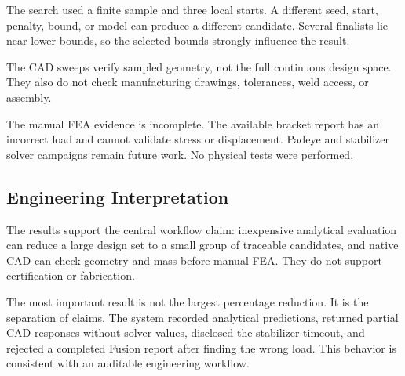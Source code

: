 The search used a finite sample and three local starts. A different seed,
start, penalty, bound, or model can produce a different candidate. Several
finalists lie near lower bounds, so the selected bounds strongly influence the
result.

The CAD sweeps verify sampled geometry, not the full continuous design space.
They also do not check manufacturing drawings, tolerances, weld access, or
assembly.

The manual FEA evidence is incomplete. The available bracket report has an
incorrect load and cannot validate stress or displacement. Padeye and
stabilizer solver campaigns remain future work. No physical tests were
performed.

\subsection{Engineering Interpretation}

The results support the central workflow claim: inexpensive analytical
evaluation can reduce a large design set to a small group of traceable
candidates, and native CAD can check geometry and mass before manual FEA.
They do not support certification or fabrication.

The most important result is not the largest percentage reduction. It is the
separation of claims. The system recorded analytical predictions, returned
partial CAD responses without solver values, disclosed the stabilizer timeout,
and rejected a completed Fusion report after finding the wrong load. This
behavior is consistent with an auditable engineering workflow.

